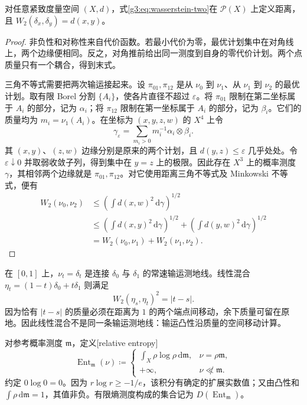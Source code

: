 \begin{proposition}\label{g3:prop:wasserstein-metric}
	对任意紧致度量空间 \((X,d)\)，式\eqref{g3:eq:wasserstein-two}在 \(\mathcal P(X)\) 上定义距离，且 \(W_2(\delta_x,\delta_y)=d(x,y)\)。
\end{proposition}
\begin{proof}
	非负性和对称性来自代价函数。若最小代价为零，最优计划集中在对角线上，两个边缘便相同。反之，对角推前给出同一测度到自身的零代价计划。两个点质量只有一个耦合，得到末式。

	三角不等式需要把两次输运接起来。设 \(\pi_{01},\pi_{12}\) 是从 \(\nu_0\) 到 \(\nu_1\)、从 \(\nu_1\) 到 \(\nu_2\) 的最优计划。取有限 Borel 分割 \(\{A_i\}\)，使各片直径不超过 \(\varepsilon\)。将 \(\pi_{01}\) 限制在第二坐标属于 \(A_i\) 的部分，记为 \(\alpha_i\)；将 \(\pi_{12}\) 限制在第一坐标属于 \(A_i\) 的部分，记为 \(\beta_i\)。它们的质量均为 \(m_i=\nu_1(A_i)\)。在坐标为 \((x,y,z,w)\) 的 \(X^4\) 上令
	\[
		\gamma_\varepsilon=\sum_{m_i>0}m_i^{-1}\alpha_i\otimes\beta_i.
	\]
	其 \((x,y)\)、\((z,w)\) 边缘分别是原来的两个计划，且 \(d(y,z)\le\varepsilon\) 几乎处处。令 \(\varepsilon\downarrow0\) 并取弱收敛子列，得到集中在 \(y=z\) 上的极限。因此存在 \(X^3\) 上的概率测度 \(\gamma\)，其相邻两个边缘就是 \(\pi_{01},\pi_{12}\)。对它使用距离三角不等式及 Minkowski 不等式，便有
	\[
		\begin{aligned}
		W_2(\nu_0,\nu_2)
		&\le\left(\int d(x,w)^2\,\mathrm d\gamma\right)^{1/2}\\
		&\le\left(\int d(x,y)^2\,\mathrm d\gamma\right)^{1/2}
		+\left(\int d(y,w)^2\,\mathrm d\gamma\right)^{1/2}\\
		&=W_2(\nu_0,\nu_1)+W_2(\nu_1,\nu_2).
		\end{aligned}
	\]
\end{proof}

\begin{example}\label{g3:exm:transport-not-mixture}
	在 \([0,1]\) 上，\(\nu_t=\delta_t\) 是连接 \(\delta_0\) 与 \(\delta_1\) 的常速输运测地线。线性混合 \(\eta_t=(1-t)\delta_0+t\delta_1\) 则满足
	\[
		W_2(\eta_s,\eta_t)^2=|t-s|.
	\]
	因为恰有 \(|t-s|\) 的质量必须在距离为 \(1\) 的两个端点间移动，余下质量可留在原地。因此线性混合不是同一条输运测地线：输运凸性沿质量的空间移动计算。
\end{example}

对参考概率测度 \(\mathfrak m\)，定义[relative entropy]
\begin{equation}\label{g3:eq:metric-relative-entropy}
	\operatorname{Ent}_{\mathfrak m}(\nu)\coloneqq
	\begin{cases}
		\displaystyle\int_X\rho\log\rho\,\mathrm d\mathfrak m,
		&\nu=\rho\mathfrak m,\\
		+\infty,&\nu\not\ll\mathfrak m.
	\end{cases}
\end{equation}
约定 \(0\log0=0\)。因为 \(r\log r\ge-1/e\)，该积分有确定的扩展实数值；又由凸性和 \(\int\rho\,\mathrm d\mathfrak m=1\)，其值非负。有限熵测度构成的集合记为 \(D(\operatorname{Ent}_{\mathfrak m})\)。

